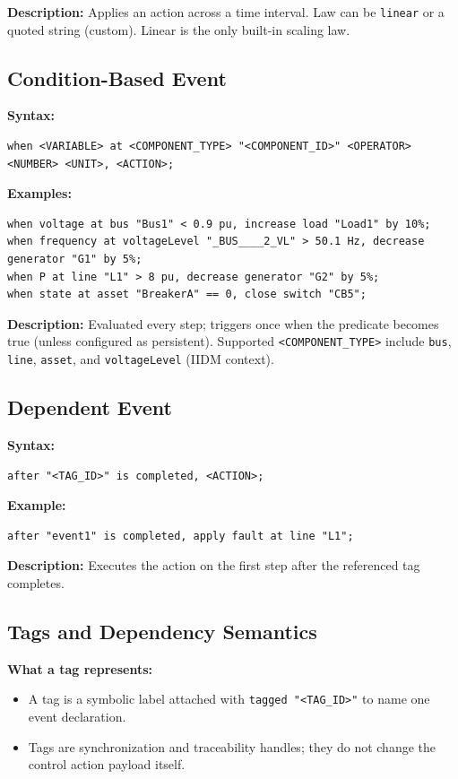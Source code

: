\documentclass[12pt]{article}
\begin{document}
\textbf{Description:} Applies an action across a time interval. Law can be \texttt{linear} or a quoted string
(custom). Linear is the only built-in scaling law.

\subsection{Condition-Based Event}

\textbf{Syntax:}
\begin{lstlisting}
when <VARIABLE> at <COMPONENT_TYPE> "<COMPONENT_ID>" <OPERATOR> <NUMBER> <UNIT>, <ACTION>;
\end{lstlisting}

\textbf{Examples:}
\begin{lstlisting}
when voltage at bus "Bus1" < 0.9 pu, increase load "Load1" by 10%;
when frequency at voltageLevel "_BUS____2_VL" > 50.1 Hz, decrease generator "G1" by 5%;
when P at line "L1" > 8 pu, decrease generator "G2" by 5%;
when state at asset "BreakerA" == 0, close switch "CB5";
\end{lstlisting}

\textbf{Description:} Evaluated every step; triggers once when the predicate becomes true (unless configured as
persistent). Supported \texttt{<COMPONENT\_TYPE>} include \texttt{bus}, \texttt{line}, \texttt{asset}, and
\texttt{voltageLevel} (IIDM context).

\subsection{Dependent Event}

\textbf{Syntax:}
\begin{lstlisting}
after "<TAG_ID>" is completed, <ACTION>;
\end{lstlisting}

\textbf{Example:}
\begin{lstlisting}
after "event1" is completed, apply fault at line "L1";
\end{lstlisting}

\textbf{Description:} Executes the action on the first step after the referenced tag completes.

\subsection{Tags and Dependency Semantics}

\textbf{What a tag represents:}
\begin{itemize}
  \item A tag is a symbolic label attached with \texttt{tagged "<TAG\_ID>"} to name one event declaration.
  \item Tags are synchronization and traceability handles; they do not change the control action payload itself.
\end{itemize}
\end{document}
